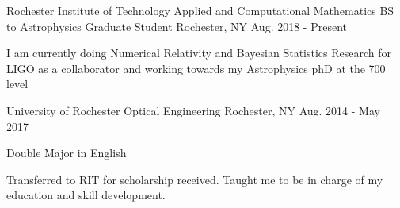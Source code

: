 \begin{cventries}
 \cventry
    {Rochester Institute of Technology}
    {Applied and Computational Mathematics BS to Astrophysics Graduate Student}
    {Rochester, NY}
    {Aug. 2018 - Present}
    {
      \begin{cvitems}
       \item{I am currently doing Numerical Relativity and Bayesian Statistics Research for LIGO as a collaborator and working towards my Astrophysics phD at the 700 level}
      \end{cvitems}
   }

  \cventry
    {University of Rochester}
    {Optical Engineering}
    {Rochester, NY}
    {Aug. 2014 - May 2017}
    {
      \begin{cvitems}
        \item {Double Major in English}
        \item {Transferred to RIT for scholarship received. Taught me to be in charge of my education and skill development.}
      \end{cvitems}
   }

\end{cventries}
